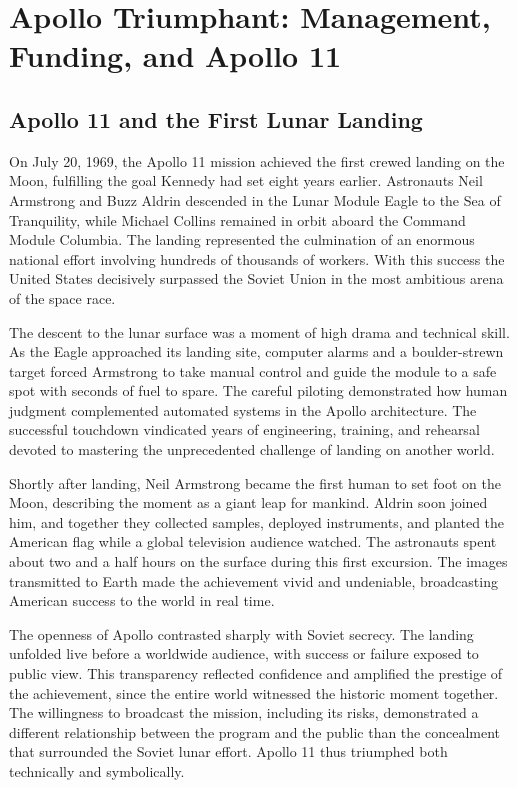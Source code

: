 \section{Apollo Triumphant: Management, Funding, and Apollo 11}

\subsection{Apollo 11 and the First Lunar Landing}
On July 20, 1969, the Apollo 11 mission achieved the first crewed landing on the Moon, fulfilling the goal Kennedy had set eight years earlier. Astronauts Neil Armstrong and Buzz Aldrin descended in the Lunar Module Eagle to the Sea of Tranquility, while Michael Collins remained in orbit aboard the Command Module Columbia. The landing represented the culmination of an enormous national effort involving hundreds of thousands of workers. With this success the United States decisively surpassed the Soviet Union in the most ambitious arena of the space race.

The descent to the lunar surface was a moment of high drama and technical skill. As the Eagle approached its landing site, computer alarms and a boulder-strewn target forced Armstrong to take manual control and guide the module to a safe spot with seconds of fuel to spare. The careful piloting demonstrated how human judgment complemented automated systems in the Apollo architecture. The successful touchdown vindicated years of engineering, training, and rehearsal devoted to mastering the unprecedented challenge of landing on another world.

Shortly after landing, Neil Armstrong became the first human to set foot on the Moon, describing the moment as a giant leap for mankind. Aldrin soon joined him, and together they collected samples, deployed instruments, and planted the American flag while a global television audience watched. The astronauts spent about two and a half hours on the surface during this first excursion. The images transmitted to Earth made the achievement vivid and undeniable, broadcasting American success to the world in real time.

The openness of Apollo contrasted sharply with Soviet secrecy. The landing unfolded live before a worldwide audience, with success or failure exposed to public view. This transparency reflected confidence and amplified the prestige of the achievement, since the entire world witnessed the historic moment together. The willingness to broadcast the mission, including its risks, demonstrated a different relationship between the program and the public than the concealment that surrounded the Soviet lunar effort. Apollo 11 thus triumphed both technically and symbolically.


